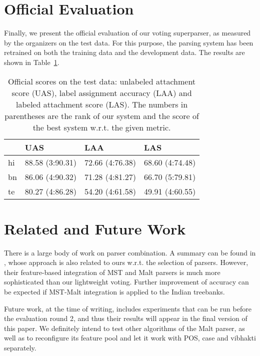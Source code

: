 \documentclass[11pt]{article}
\def\Tref#1{Table~\ref{#1}}
\begin{document}
\section{Official Evaluation}
\label{sec:evaluation}

Finally, we present the official evaluation of our voting superparser, as measured by the organizers on the test data. For this purpose, the parsing system has been retrained on both the training data and the development data. The results are shown in \Tref{tab:evaluation}.

\begin{table}[ht]
\begin{centering}
\small
\begin{tabular}{l|l|l|l}
& \textbf{UAS} & \textbf{LAA} & \textbf{LAS} \\
\hline
hi & 88.58 (3:90.31) & 72.66 (4:76.38) & 68.60 (4:74.48)\\
bn & 86.06 (4:90.32) & 71.28 (4:81.27) & 66.70 (5:79.81)\\
te & 80.27 (4:86.28) & 54.20 (4:61.58) & 49.91 (4:60.55)\\
\end{tabular}
\caption{Official scores on the test data: unlabeled attachment score (UAS), label assignment accuracy (LAA) and labeled attachment score (LAS). The numbers in parentheses are the rank of our system and the score of the best system w.r.t. the given metric.}
\label{tab:evaluation}
\end{centering}
\end{table}

\section{Related and Future Work}
\label{sec:related}

There is a large body of work on parser combination. A summary can be found in \citet{nivre-mcdonald:2008:ACLMain}, whose approach is also related to ours w.r.t. the selection of parsers. However, their feature-based integration of MST and Malt parsers is much more sophisticated than our lightweight voting. Further improvement of accuracy can be expected if MST-Malt integration is applied to the Indian treebanks.

Future work, at the time of writing, includes experiments that can be run before the evaluation round 2, and thus their results will appear in the final version of this paper. We definitely intend to test other algorithms of the Malt parser, as well as to reconfigure its feature pool and let it work with POS, case and vibhakti separately.
\end{document}
